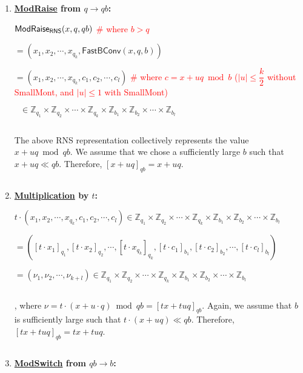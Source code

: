 \begin{enumerate}

\item \textbf{\underline{\textsf{ModRaise}} from $q \rightarrow qb$:}

$\textsf{ModRaise\textsubscript{RNS}}(x, q, qb)$ \textcolor{red}{ \# where $b > q$}

$= (x_1, x_2, \cdots, x_{q_k}, \textsf{FastBConv}(x, q, b))$

$= (x_1, x_2, \cdots, x_{q_k}, c_1, c_2, \cdots, c_l)$
 \textcolor{red}{ \# where $c = x + uq \bmod b$ ($|u| \leq \dfrac{k}{2}$ without \textsf{SmallMont}, and $|u| \leq 1$ with \textsf{SmallMont})}
 
$ 
\text{ } \in \mathbb{Z}_{q_1} \times \mathbb{Z}_{q_2} \times \cdots \times \mathbb{Z}_{q_k} \times \mathbb{Z}_{b_1} \times \mathbb{Z}_{b_2} \times \cdots \times \mathbb{Z}_{b_l}$   

$ $ 

The above RNS representation collectively represents the value $x + uq \bmod qb$. We assume that we chose a sufficiently large $b$ such that $x + uq \ll qb$. Therefore, $[x + uq]_{qb} = x + uq$.

$ $

\item \textbf{\underline{Multiplication} by $t$:} 

$t\cdot 
(x_1, x_2, \cdots, x_{q_k}, c_1, c_2, \cdots, c_l)
\in \mathbb{Z}_{q_1} \times \mathbb{Z}_{q_2} \times \cdots \times \mathbb{Z}_{q_k} \times \mathbb{Z}_{b_1} \times \mathbb{Z}_{b_2} \times \cdots \times \mathbb{Z}_{b_l}$

$ = 
([t\cdot x_1]_{q_1}, [t\cdot x_2]_{q_2}, \cdots, [t\cdot x_{q_k}]_{q_k}, [t\cdot c_1]_{b_1}, [t\cdot c_2]_{b_2}, \cdots, [t\cdot c_l]_{b_l})$ 


$ = (\nu_1, \nu_2, \cdots, \nu_{k+l}) \in \mathbb{Z}_{q_1} \times \mathbb{Z}_{q_2} \times \cdots \times \mathbb{Z}_{q_k} \times \mathbb{Z}_{b_1} \times \mathbb{Z}_{b_2} \times \cdots \times \mathbb{Z}_{b_l}$

$ $

, where $\nu = t\cdot (x + u\cdot q) \bmod qb = [tx + tuq]_{qb}$. Again, we assume that $b$ is sufficiently large such that $t\cdot(x + uq) \ll qb$. Therefore, $[tx + tuq]_{qb} = tx + tuq$.

$ $

\item \textbf{\underline{\textsf{ModSwitch}} from $qb \rightarrow b$:}


\end{enumerate}
